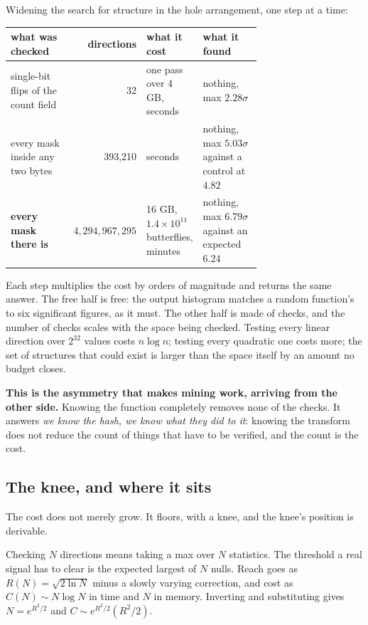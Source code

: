 Widening the search for structure in the hole arrangement, one step at a time:

\begin{center}
\begin{tabular}{@{}p{0.26\linewidth}rp{0.2\linewidth}p{0.24\linewidth}@{}}
\toprule
what was checked & directions & what it cost & what it found \\
\midrule
single-bit flips of the count field & 32 & one pass over 4 GB, seconds & nothing, max \(2.28\sigma\) \\
every mask inside any two bytes & 393,210 & seconds & nothing, max \(5.03\sigma\) against a control at \(4.82\) \\
\textbf{every mask there is} & \(4{,}294{,}967{,}295\) & 16 GB, \(1.4\times10^{11}\) butterflies, minutes & nothing, max \(6.79\sigma\) against an expected \(6.24\) \\
\bottomrule
\end{tabular}
\end{center}

Each step multiplies the cost by orders of magnitude and returns the same answer. The free half is free: the output histogram matches a random function's to six significant figures, as it must. The other half is made of checks, and the number of checks scales with the space being checked. Testing every linear direction over \(2^{32}\) values costs \(n\log n\); testing every quadratic one costs more; the set of structures that could exist is larger than the space itself by an amount no budget closes.

\textbf{This is the asymmetry that makes mining work, arriving from the other side.} Knowing the function completely removes none of the checks. It answers \emph{we know the hash, we know what they did to it}: knowing the transform does not reduce the count of things that have to be verified, and the count is the cost.

\subsection{The knee, and where it sits}

The cost does not merely grow. It floors, with a knee, and the knee's position is derivable.

Checking \(N\) directions means taking a max over \(N\) statistics. The threshold a real signal has to clear is the expected largest of \(N\) nulls. Reach goes as \(R(N) = \sqrt{2\ln N}\) minus a slowly varying correction, and cost as \(C(N) \sim N\log N\) in time and \(N\) in memory. Inverting and substituting gives \(N = e^{R^2/2}\) and \(C \sim e^{R^2/2}(R^2/2)\).

